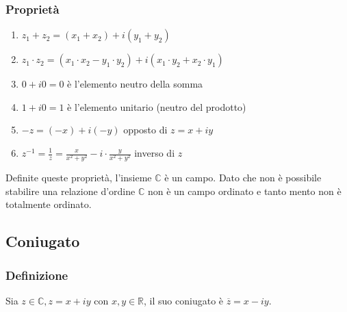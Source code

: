 \documentclass[a4paper]{article}
\begin{document}
\subsubsection*{Proprietà}
\begin{enumerate}
	\item \(z_1 + z_2 = (x_1 + x_2) + i (y_1 + y_2)\)
	\item \(z_1 \cdot z_2 = (x_1 \cdot x_2 - y_1 \cdot y_2) + i (x_1 \cdot y_2 + x_2 \cdot y_1)\)
	\item \(0 + i0 = 0 \) è l'elemento neutro della somma
	\item \(1 + i0 = 1 \) è l'elemento unitario (neutro del prodotto)
	\item \(-z = (-x) + i(-y)\) opposto di \(z = x + iy\)
	\item \(\displaystyle z^{-1} = \frac{1}{z} = \frac{x}{x^2 + y^2} - i \cdot \frac{y}{x^2 + y^2}\) inverso di \(z\)
\end{enumerate}
Definite queste proprietà, l'insieme \(\mathbb{C}\) è un campo. Dato che non è possibile stabilire una relazione d'ordine \(\mathbb{C}\)
non è un campo ordinato e tanto mento non è totalmente ordinato.


\subsection{Coniugato}
\subsubsection*{Definizione}
Sia \(z \in \mathbb{C}, z = x + i y\) con \(x,y \in \mathbb{R}\), il suo coniugato è \(\overline{z} = x - iy\).
\end{document}
